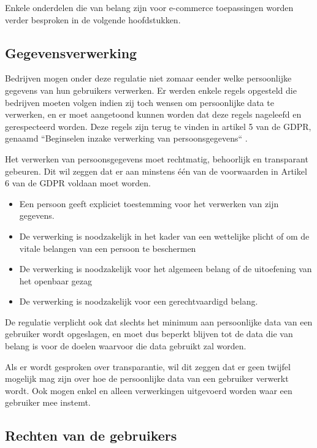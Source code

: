 Enkele onderdelen die van belang zijn voor e-commerce toepassingen worden verder besproken in de volgende hoofdstukken.

\subsection{Gegevensverwerking}
\label{subsec: Gegevensverwerking}

Bedrijven mogen onder deze regulatie niet zomaar eender welke persoonlijke gegevens van hun gebruikers verwerken. Er werden enkele regels opgesteld die bedrijven moeten volgen indien zij toch wensen om persoonlijke data te verwerken, en er moet aangetoond kunnen worden dat deze regels nageleefd en gerespecteerd worden. Deze regels zijn terug te vinden in artikel 5 van de GDPR, genaamd ``Beginselen inzake verwerking van persoonsgegevens`` \autocite{Article5GDPR2018}.

Het verwerken van persoonsgegevens moet rechtmatig, behoorlijk en transparant gebeuren. Dit wil zeggen dat er aan minstens één van de voorwaarden in Artikel 6 van de GDPR voldaan moet worden.
\begin{itemize}
	\item Een persoon geeft expliciet toestemming voor het verwerken van zijn gegevens.
	\item De verwerking is noodzakelijk in het kader van een wettelijke plicht of om de vitale belangen van een persoon te beschermen
	\item  De verwerking is noodzakelijk voor het algemeen belang of de uitoefening van het openbaar gezag
	\item De verwerking is noodzakelijk voor een gerechtvaardigd belang. 
\end{itemize}
\autocite{Article6GDPR2018}

De regulatie verplicht ook dat slechts het minimum aan persoonlijke data van een gebruiker wordt opgeslagen, en moet dus beperkt blijven tot de data die van belang is voor de doelen waarvoor die data gebruikt zal worden.

Als er wordt gesproken over transparantie, wil dit zeggen dat er geen twijfel mogelijk mag zijn over hoe de persoonlijke data van een gebruiker verwerkt wordt. Ook mogen enkel en alleen verwerkingen uitgevoerd worden waar een gebruiker mee instemt.


\subsection{Rechten van de gebruikers}
\label{subsec: Rechten van de gebruikers}

